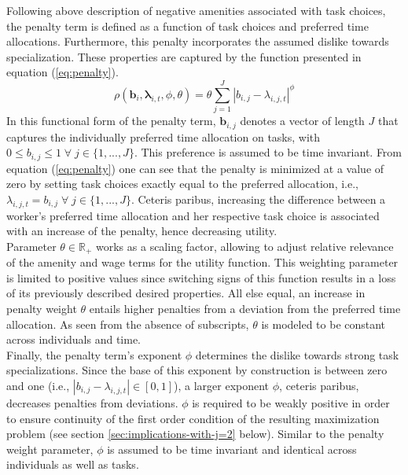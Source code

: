 \documentclass[../main.tex]{subfiles}
\begin{document}
Following above description of negative amenities associated with task choices, the penalty term is defined as a function of task choices and preferred time allocations. Furthermore, this penalty incorporates the assumed dislike towards specialization. These properties are captured by the function presented in equation (\ref{eq:penalty}).
\begin{equation}\label{eq:penalty}
	\rho(\boldsymbol{b}_i, \boldsymbol{\lambda}_{i,t}, \phi, \theta) = \theta \sum^J_{j=1} |b_{i,j} - \lambda_{i,j,t}|^\phi
\end{equation}
In this functional form of the penalty term, $\boldsymbol{b}_{i,j}$ denotes a vector of length $J$ that captures the individually preferred time allocation on tasks, with $0 \leq b_{i,j} \leq 1 \;  \forall \; j \in \{1, ..., J\}$. This preference is assumed to be time invariant. From equation (\ref{eq:penalty}) one can see that the penalty is minimized at a value of zero by setting task choices exactly equal to the preferred allocation, i.e., $\lambda_{i,j,t} = b_{i,j} \; \forall \; j \in \{1, ..., J\}$. Ceteris paribus, increasing the difference between a worker's preferred time allocation and her respective task choice is associated with an increase of the penalty, hence decreasing utility.
\\
Parameter $\theta \in \mathbb{R}_+$ works as a scaling factor, allowing to adjust relative relevance of the amenity and wage terms for the utility function. This weighting parameter is limited to positive values since switching signs of this function results in a loss of its previously described desired properties. All else equal, an increase in penalty weight $\theta$ entails higher penalties from a deviation from the preferred time allocation. As seen from the absence of subscripts, $\theta$ is modeled to be constant across individuals and time. 
\\
Finally, the penalty term's exponent $\phi$ determines the dislike towards strong task specializations. Since the base of this exponent by construction is between zero and one (i.e., $|b_{i,j} - \lambda_{i,j,t}| \in [0,1]$), a larger exponent $\phi$, ceteris paribus, decreases penalties from deviations. $\phi$ is required to be weakly positive in order to ensure continuity of the first order condition of the resulting maximization problem (see section \ref{sec:implications-with-j=2} below). Similar to the penalty weight parameter, $\phi$ is assumed to be time invariant and identical across individuals as well as tasks.
\\
\end{document}
